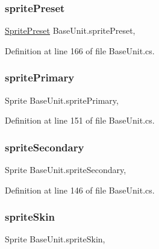\subsubsection{\texorpdfstring{spritePreset}{spritePreset}}
{\footnotesize\ttfamily \mbox{\hyperlink{class_base_unit_a086712791ce1a3cb5dc6448d8bbc1f62}{Sprite\+Preset}} Base\+Unit.\+sprite\+Preset\hspace{0.3cm}{\ttfamily [get]}, {\ttfamily [set]}}



Definition at line 166 of file Base\+Unit.\+cs.

\mbox{\label{class_base_unit_afd07b93b34faf4f08c6195c96619cfe8}} 
\subsubsection{\texorpdfstring{spritePrimary}{spritePrimary}}
{\footnotesize\ttfamily Sprite Base\+Unit.\+sprite\+Primary\hspace{0.3cm}{\ttfamily [get]}, {\ttfamily [set]}}



Definition at line 151 of file Base\+Unit.\+cs.

\mbox{\label{class_base_unit_a813d9604cb00579ee1f774383fab35c9}} 
\subsubsection{\texorpdfstring{spriteSecondary}{spriteSecondary}}
{\footnotesize\ttfamily Sprite Base\+Unit.\+sprite\+Secondary\hspace{0.3cm}{\ttfamily [get]}, {\ttfamily [set]}}



Definition at line 146 of file Base\+Unit.\+cs.

\mbox{\label{class_base_unit_a09675ae67d9c7f5de53c5ed8033a1d62}} 
\subsubsection{\texorpdfstring{spriteSkin}{spriteSkin}}
{\footnotesize\ttfamily Sprite Base\+Unit.\+sprite\+Skin\hspace{0.3cm}{\ttfamily [get]}, {\ttfamily [set]}}



